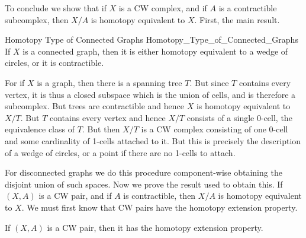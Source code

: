 \documentclass{book}                                                           %
\begin{document}
                To conclude we show that if $X$ is a CW complex, and if $A$ is a
                contractible subcomplex, then $X/A$ is homotopy equivalent to
                $X$. First, the main result.
                \begin{ftheorem}{Homotopy Type of Connected Graphs}
                                {Homotopy_Type_of_Connected_Graphs}
                    If $X$ is a connected graph, then it is either homotopy
                    equivalent to a wedge of circles, or it is contractible.
                \end{ftheorem}
                \begin{bproof}
                    For if $X$ is a graph, then there is a spanning tree $T$.
                    But since $T$ contains every vertex, it is thus a closed
                    subspace which is the union of cells, and is therefore a
                    subcomplex. But trees are contractible and hence $X$ is
                    homotopy equivalent to $X/T$. But $T$ contains every vertex
                    and hence $X/T$ consists of a single 0-cell, the equivalence
                    class of $T$. But then $X/T$ is a CW complex consisting of
                    one 0-cell and some cardinality of 1-cells attached to it.
                    But this is precisely the description of a wedge of circles,
                    or a point if there are no 1-cells to attach.
                \end{bproof}
                For disconnected graphs we do this procedure component-wise
                obtaining the disjoint union of such spaces. Now we prove the
                result used to obtain this. If $(X,A)$ is a CW pair, and if $A$
                is contractible, then $X/A$ is homotopy equivalent to $X$. We
                must first know that CW pairs have the homotopy extension
                property.
                \begin{theorem}
                    If $(X,A)$ is a CW pair, then it has the homotopy extension
                    property.
                \end{theorem}
\end{document}

